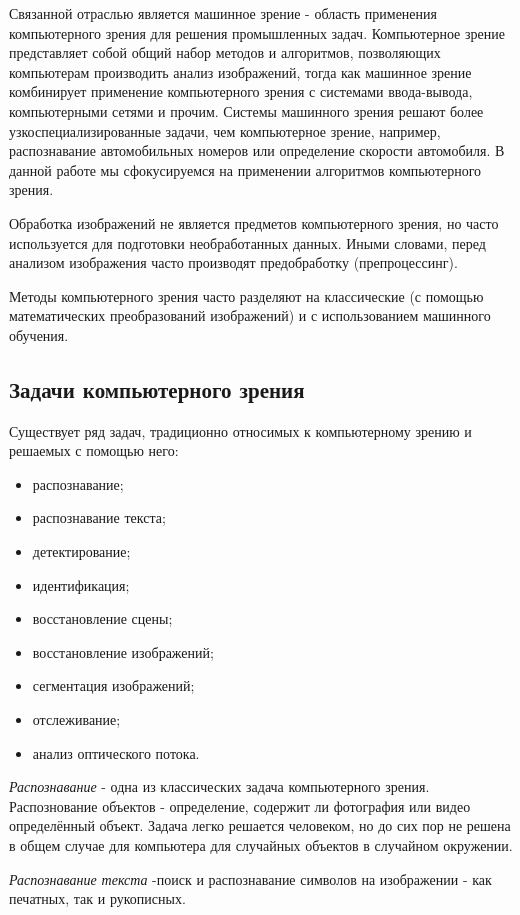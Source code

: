 \documentclass[specification,annotation,times]{itmo-student-thesis}
\begin{document}
Связанной отраслью является машинное зрение  - область применения компьютерного зрения для решения промышленных задач.  Компьютерное зрение представляет собой общий набор методов и алгоритмов, позволяющих компьютерам производить анализ изображений, тогда как машинное зрение комбинирует применение компьютерного зрения с системами ввода-вывода, компьютерными сетями и прочим.  Системы машинного зрения решают более узкоспециализированные задачи, чем компьютерное зрение, например, распознавание автомобильных номеров или определение скорости автомобиля. В данной работе мы сфокусируемся на применении алгоритмов компьютерного зрения.

Обработка изображений не является предметов компьютерного зрения, но часто используется для подготовки необработанных данных. Иными словами, перед анализом изображения часто производят предобработку (препроцессинг).

Методы компьютерного зрения часто разделяют на классические (с помощью математических преобразований изображений) и с использованием машинного обучения.  


\subsection{Задачи компьютерного зрения}\label{cvtasks}
Существует ряд задач, традиционно относимых к компьютерному зрению и решаемых с помощью него:
\begin{itemize}
\item распознавание;
\item распознавание текста;
\item детектирование;
\item идентификация;
\item восстановление сцены;
\item восстановление изображений;
\item сегментация изображений;
\item отслеживание;
\item анализ оптического потока.
\end{itemize}

\textit{Распознавание} - одна из  классических задача компьютерного зрения. Распознование объектов - определение, содержит ли фотография или видео определённый объект. Задача легко решается человеком, но до сих пор не решена в общем случае для компьютера для случайных объектов в случайном окружении. 


\textit{Распознавание текста} -поиск и распознавание символов на изображении - как печатных, так и рукописных. 
\end{document}
